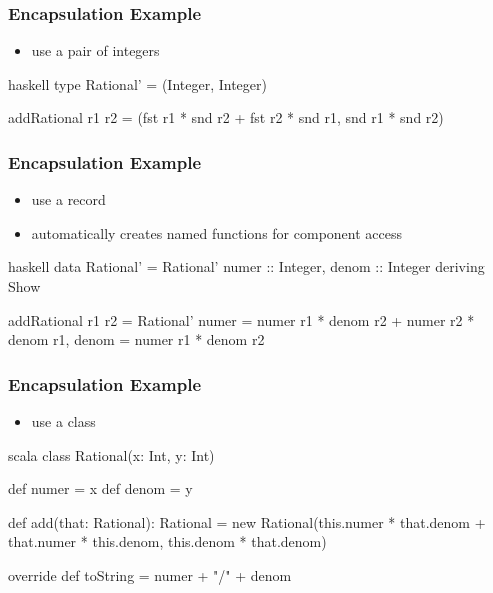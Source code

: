 \documentclass[dvipsnames]{beamer}
\theoremstyle{plain}
\begin{document}
\begin{frame}[fragile]
  \frametitle{Encapsulation Example}

  \begin{example}[Haskell]
    \begin{itemize}
      \item use a pair of integers
    \end{itemize}

    \medskip
    \begin{pygments}{haskell}
type Rational' = (Integer, Integer)

addRational r1 r2 =
    (fst r1 * snd r2 + fst r2 * snd r1, snd r1 * snd r2)
    \end{pygments}
  \end{example}
\end{frame}

\begin{frame}[fragile]
  \frametitle{Encapsulation Example}

  \begin{example}[Haskell]
    \begin{itemize}
      \item use a record
      \item automatically creates named functions for component access
    \end{itemize}

    \medskip
    \begin{pygments}{haskell}
data Rational' =
    Rational' {numer :: Integer, denom :: Integer}
    deriving Show

addRational r1 r2 =
    Rational' {numer = numer r1 * denom r2 +
                       numer r2 * denom r1,
               denom = numer r1 * denom r2}
    \end{pygments}
  \end{example}
\end{frame}

\begin{frame}[fragile]
  \frametitle{Encapsulation Example}

  \begin{example}[Scala]
    \begin{itemize}
      \item use a class
    \end{itemize}

    \medskip
    \begin{pygments}{scala}
class Rational(x: Int, y: Int) {
    def numer = x
    def denom = y

    def add(that: Rational): Rational =
        new Rational(this.numer * that.denom +
                         that.numer * this.denom,
                     this.denom * that.denom)

    override def toString =
        numer + "/" + denom
}
    \end{pygments}
  \end{example}
\end{frame}
\end{document}
